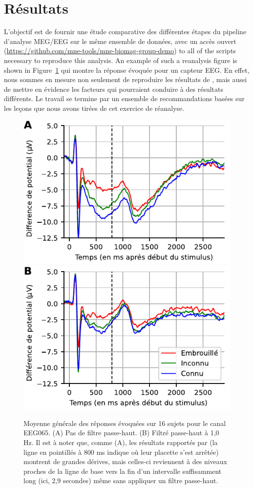 \section*{Résultats}

L'objectif est de fournir une étude comparative des différentes étapes du pipeline d'analyse MEG/EEG sur le même ensemble de données, avec un accès ouvert (\url{https://github.com/mne-tools/mne-biomag-group-demo}) to all of the scripts necessary to reproduce this analysis. An example of such a reanalysis figure is shown in Figure~\ref{fig:sommaire:grand_average} qui montre la réponse évoquée pour un capteur EEG. En effet, nous sommes en mesure non seulement de reproduire les résultats de \citet{wakeman2015multi}, mais aussi de mettre en évidence les facteurs qui pourraient conduire à des résultats différents. Le travail se termine par un ensemble de recommandations basées sur les leçons que nous avons tirées de cet exercice de réanalyse.

\begin{figure}[htb]
  \centering
  \includegraphics[width=0.7\linewidth]{figures/grand_average_highpass-NoneHz_sommaire.pdf}\\
  \includegraphics[width=0.7\linewidth]{figures/grand_average_highpass-1Hz_sommaire.pdf}
\caption[]{Moyenne générale des réponses évoquées sur 16 sujets pour le canal EEG065. (A) Pas de filtre passe-haut. (B) Filtré passe-haut à 1,0 Hz. Il est à noter que, comme (A), les résultats rapportés par \cite{wakeman2015multi} (la ligne en pointillés à 800 ms indique où leur placette s'est arrêtée) montrent de grandes dérives, mais celles-ci reviennent à des niveaux proches de la ligne de base vers la fin d'un intervalle suffisamment long (ici, 2,9 secondes) même sans appliquer un filtre passe-haut.}
\label{fig:sommaire:grand_average}
\end{figure}  

